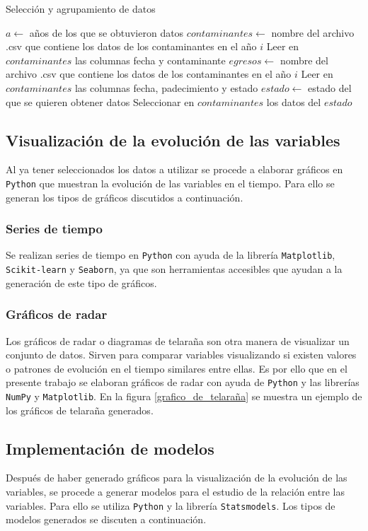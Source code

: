 \documentclass[3p,times]{elsarticle}
\begin{document}
\begin{algorithm}
\caption{Selección y agrupamiento de datos}\label{alg:a1}
\begin{algorithmic}[1]
\State $a \leftarrow $ años de los que se obtuvieron datos
    \State $contaminantes \leftarrow $ nombre del archivo .csv que contiene los datos de los contaminantes en el año $i$
    \State Leer en $contaminantes$ las columnas fecha y contaminante 
    \State $egresos \leftarrow $ nombre del archivo .csv que contiene los datos de los contaminantes en el año $i$
    \State Leer en $contaminantes$ las columnas fecha, padecimiento y estado
    \State $estado \leftarrow $ estado del que se quieren obtener datos
    \State Seleccionar en $contaminantes$ los datos del $estado$
\EndFor
\end{algorithmic} 
\end{algorithm}

\subsection{Visualización de la evolución de las variables}
Al ya tener seleccionados los datos a utilizar se procede a elaborar gráficos en \texttt{Python} que muestran la evolución de las variables en el tiempo. Para ello se generan los tipos de gráficos discutidos a continuación.

\subsubsection{Series de tiempo}
Se realizan series de tiempo en \texttt{Python} con ayuda de la librería  \texttt{Matplotlib}, \texttt{Scikit-learn} y \texttt{Seaborn}, ya que son herramientas accesibles que ayudan a la generación de este tipo de gráficos.

\subsubsection{Gráficos de radar}
Los gráficos de radar o diagramas de telaraña son otra manera de visualizar un conjunto de datos. Sirven para comparar variables visualizando si existen valores o patrones de evolución en el tiempo similares entre ellas. Es por ello que en el presente trabajo se elaboran gráficos de radar con ayuda de \texttt{Python} y las librerías \texttt{NumPy} y \texttt{Matplotlib}. En la figura \ref{grafico_de_telaraña} se muestra un ejemplo de los gráficos de telaraña generados.

\subsection{Implementación de modelos}
Después de haber generado gráficos para la visualización de la evolución de las variables, se procede a generar modelos para el estudio de la relación entre las variables. Para ello se utiliza \texttt{Python} y la librería \texttt{Statsmodels}. Los tipos de modelos generados se discuten a continuación.
\end{document}
